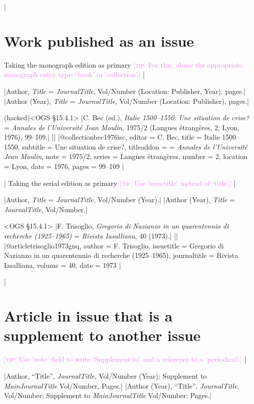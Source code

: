 \documentclass[extrafontsizes,11pt,a4paper,oneside]{memoir}
\newcommand*{\lit}[1]{\textsf{#1}}
\newcommand*{\code}[1]{`\textsf{#1}'}
\newcommand*{\aside}[1]{\textcolor{violet}{[\textsc{tip:} #1]}}
\begin{document}
\todoc|
\section{Work published as an issue}

Taking the monograph edition as primary \aside{For this, abuse the appropriate monograph entry type: \code{book} or \code{collection}.}
|

\specs
|Author, \emph{Title} = \emph{JournalTitle}, Vol/Number (Location: Publisher, Year), pages.|%
|Author (Year), \emph{Title} = \emph{JournalTitle}, Vol/Number (Location: Publisher), pages.|

\bibexample(hacked)<OGS \S15.4.1>
|C. Bec (ed.), \emph{Italie 1500--1550: Une situation de crise?} = \emph{Annales de l'Université Jean Moulin}, 1975/2 (Langues étrangères, 2; Lyon, 1976), 99--109.|%
||%
|@collection{bec1976isc,
  editor = {C. Bec},
  title = {Italie 1500--1550},
  subtitle = {Une situation de crise?\nopunct},
  titleaddon = {= \emph{Annales de l'Université Jean Moulin}},
  note = {1975/2},
  series = {Langues étrangères},
  number = {2},
  location = {Lyon},
  date = {1976},
  pages = {99--109}
}|
  
\todoc|
Taking the serial edition as primary \aside{Use \code{issuetitle} instead of \code{title}.}
|

\specs
|Author, \emph{Title} = \emph{JournalTitle}, Vol/Number (Year).|%
|Author (Year), \emph{Title} = \emph{JournalTitle}, Vol/Number.|

\bibexample<OGS \S15.4.1>
|F. Trisoglio, \emph{Gregorio di Nazianzo in un quarentennio di recherche (1925--1965)} = \emph{Rivista Iasalliana}, 40 (1973).|%
||%
|@article{trisoglio1973gnq,
  author = {F. Trisoglio},
  issuetitle = {Gregorio di Nazianzo in un quarentennio di recherche (1925--1965)},
  journaltitle = {Rivista Iasalliana},
  volume = {40},
  date = {1973}
}|
  
\todoc|
\section{Article in issue that is a supplement to another issue}

\aside{Use \code{note} field to write ‘Supplement to’ and a reference to a \code{periodical}.}
|

\specs
|Author, \enquote{Title}, \emph{JournalTitle}, Vol/Number (Year); \lit{Supplement to} \emph{MainJournalTitle} Vol/Number, Pages.|%
|Author (Year), \enquote{Title}, \emph{JournalTitle}, Vol/Number; \lit{Supplement to} \emph{MainJournalTitle} Vol/Number: Pages.|
\end{document}
